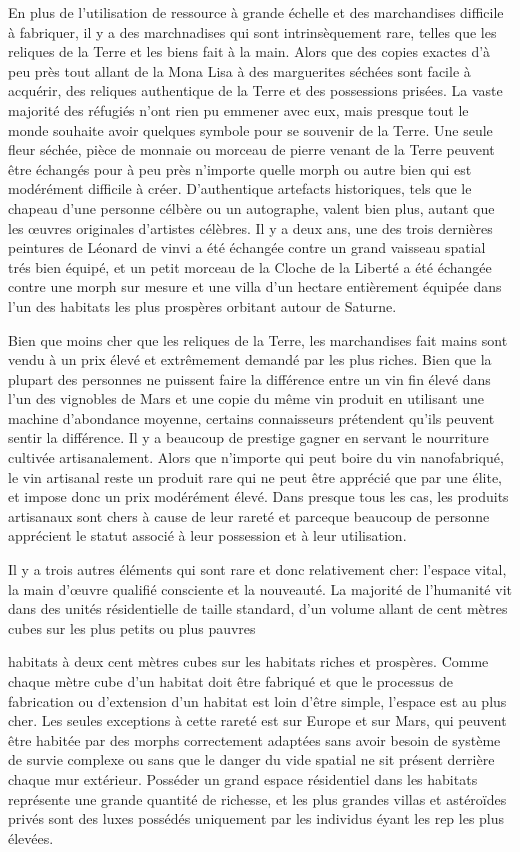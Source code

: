 En plus de l'utilisation de ressource à grande échelle et des marchandises difficile à fabriquer, il y a des marchnadises qui sont intrinsèquement rare, telles que les reliques de la Terre et les biens fait à la main. Alors que des copies exactes d'à peu près tout allant de la Mona Lisa à des marguerites séchées sont facile à acquérir, des reliques authentique de la Terre et des possessions prisées. La vaste majorité des réfugiés n'ont rien pu emmener avec eux, mais presque tout le monde souhaite avoir quelques symbole pour se souvenir de la Terre. Une seule fleur séchée, pièce de monnaie ou morceau de pierre venant de la Terre peuvent être échangés pour à peu près n'importe quelle morph ou autre bien qui est modérément difficile à créer. D'authentique artefacts historiques, tels que le chapeau d'une personne célbère ou un autographe, valent bien plus, autant que les œuvres originales d'artistes célèbres. Il y a deux ans, une des trois dernières peintures de Léonard de vinvi a été échangée contre un grand vaisseau spatial trés bien équipé, et un petit morceau de la Cloche de la Liberté a été échangée contre une morph sur mesure et une villa d'un hectare entièrement équipée dans l'un des habitats les plus prospères orbitant autour de Saturne. 

Bien que moins cher que les reliques de la Terre, les marchandises fait mains sont vendu à un prix élevé et extrêmement demandé par les plus riches. Bien que la plupart des personnes ne puissent faire la différence entre un vin fin élevé dans l'un des vignobles de Mars et une copie du même vin produit en utilisant une machine d'abondance moyenne, certains connaisseurs prétendent qu'ils peuvent sentir la différence. Il y a beaucoup de prestige  gagner en servant le nourriture cultivée artisanalement. Alors que n'importe qui peut boire du vin nanofabriqué, le vin artisanal reste un produit rare qui ne peut être apprécié que par une élite, et impose donc un prix modérément élevé. Dans presque tous les cas, les produits artisanaux sont chers à cause de leur rareté et parceque beaucoup de personne apprécient le statut associé à leur possession et à leur utilisation. 

Il y a trois autres éléments qui sont rare et donc relativement cher: l'espace vital, la main d'œuvre qualifié consciente et la nouveauté. La majorité de l'humanité vit dans des unités résidentielle de taille standard, d'un volume allant de cent mètres cubes sur les plus petits ou plus pauvres 

habitats à deux cent mètres cubes sur les habitats riches et prospères. Comme chaque mètre cube d'un habitat doit être fabriqué et que le processus de fabrication ou d'extension d'un habitat est loin d'être simple, l'espace est au plus cher. Les seules exceptions à cette rareté est sur Europe et sur Mars, qui peuvent être habitée par des morphs correctement adaptées sans avoir besoin de système de survie complexe ou sans que le danger du vide spatial ne sit présent derrière chaque mur extérieur. Posséder un grand espace résidentiel dans les habitats représente une grande quantité de richesse, et les plus grandes villas et astéroïdes privés sont des luxes possédés uniquement par les individus éyant les rep les plus élevées. 

